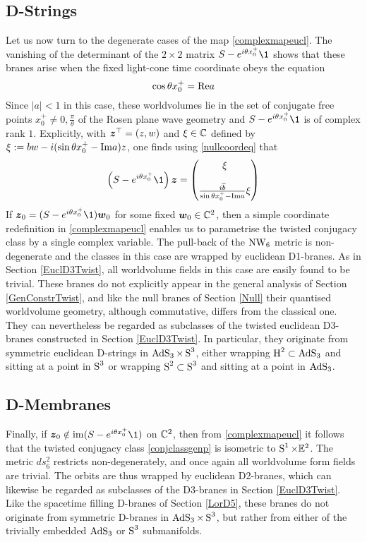 \subsection{D-Strings}
\label{DStrings}
Let us now turn to the degenerate cases of the map \eqref{complexmapeucl}. The
vanishing of the determinant of the $2\times2$ matrix $S- e^{ i\theta x_0^+} \1$
shows that these branes arise when the fixed light-cone time coordinate obeys
the equation
\begin{equation}
  \label{nullcoordeq}
  \cos\theta x_0^+={\rm Re} a
\end{equation}
Since $|a|<1$ in this case, these worldvolumes lie in the set of conjugate free
points $x_0^+\neq0,\frac\pi\theta$ of the Rosen plane wave geometry and $S- e^{
  i\theta x_0^+} \1$ is of complex rank $1$. Explicitly, with $\mz^\top=(z,w)$ and
$\xi\in\C$ defined by $\xi:=b w- i(\sin\theta x_0^+-{\rm Im} a) z$, one finds
using \eqref{nullcoordeq} that
\begin{equation}
  \label{Sdegexpl}
  \left(S- e^{ i\theta x_0^+} \1\right)\mz=
  \begin{pmatrix}
    \xi\\[4mm]
    \frac{ i\overline{b}}{\sin\theta x_0^+-{\rm Im} a} \xi
  \end{pmatrix}
\end{equation}
If $\mz_0=(S- e^{ i\theta x_0^+} \1)\mw_0$ for some fixed $\mw_0\in\C^2$,
then a simple coordinate redefinition in \eqref{complexmapeucl} enables us to
parametrise the twisted conjugacy class by a single complex variable. The
pull-back of the $\NW_6$ metric is non-degenerate and the classes in this case
are wrapped by euclidean D1-branes. As in Section \ref{EuclD3Twist}, all
worldvolume fields in this case are easily found to be trivial. These branes do
not explicitly appear in the general analysis of Section \ref{GenConstrTwist},
and like the null branes of Section \ref{Null} their quantised worldvolume
geometry, although commutative, differs from the classical one. They can
nevertheless be regarded as subclasses of the twisted euclidean D3-branes
constructed in Section \ref{EuclD3Twist}. In particular, they originate from
symmetric euclidean D-strings in $\AdS_3\times\S^3$, either wrapping
$\Hyp^2\subset\AdS_3$ and sitting at a point in $\S^3$ or wrapping
$\S^2\subset\S^3$ and sitting at a point in $\AdS_3$.

\subsection{D-Membranes}
\label{DMem}
Finally, if $\mz_0\notin{\rm im}(S- e^{ i\theta x_0^+} \1)$ on
$\C^2$, then from \eqref{complexmapeucl} it follows that the
twisted conjugacy class \eqref{conjclassgenp} is isometric to
$\S^1\times\E^2$. The metric $ d s_6^2$ restricts
non-degenerately, and once again all worldvolume form fields are
trivial. The orbits are thus wrapped by euclidean D2-branes, which can
likewise be regarded as subclasses of the D3-branes in
Section \ref{EuclD3Twist}. Like the spacetime filling D-branes of
Section \ref{LorD5}, these branes do not originate from symmetric
D-branes in $\AdS_3\times\S^3$, but rather from either of the
trivially embedded $\AdS_3$ or $\S^3$ submanifolds.

